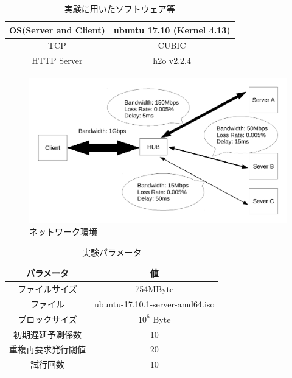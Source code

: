 \documentclass[a4j,12pt]{gradthesis_utf8}
\begin{document}
\begin{table}[htb]
	\begin{center}
		\caption{実験に用いたソフトウェア等}
		\label{env}
		\begin{tabular}{|c|c|} \hline
			OS(Server and Client) & ubuntu 17.10 (Kernel 4.13)\\ \hline
			TCP & CUBIC \\ \hline
			HTTP Server & h2o v2.2.4 \\ \hline
		\end{tabular}
	\end{center}
\end{table}

\begin{figure}[h]
	\centering
	\label{network}
	\includegraphics[width=16cm]{figure/test_network.pdf}
	\caption{ネットワーク環境}
\end{figure}

\begin{table}[htb]
	\begin{center}
		\caption{実験パラメータ}
		\label{param}
		\begin{tabular}{|c|c|} \hline
			パラメータ & 値\\ \hline \hline
			ファイルサイズ & 754MByte\\ \hline
			ファイル &  ubuntu-17.10.1-server-amd64.iso\\ \hline
			ブロックサイズ & \(10^6\) Byte\\ \hline
			初期遅延予測係数 & 10 \\ \hline
			重複再要求発行閾値 & 20 \\ \hline
			試行回数 & 10 \\ \hline
		\end{tabular}
	\end{center}
\end{table}
\end{document}
